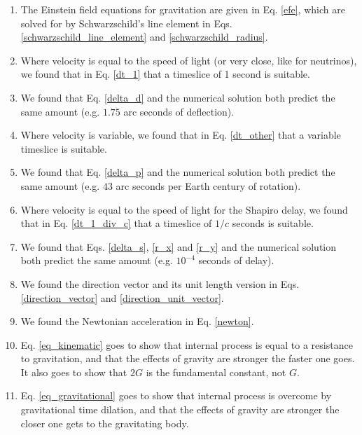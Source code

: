 \documentclass[12pt]{article}
\begin{document}
\begin{enumerate}

\item
The Einstein field equations for gravitation are given in Eq. \ref{efe}, which are solved for by Schwarzschild's line element in Eqs. \ref{schwarzschild_line_element} and \ref{schwarzschild_radius}.

\item
Where velocity is equal to the speed of light (or very close, like for neutrinos), we found that in Eq. \ref{dt_1} that a timeslice of 1 second is suitable.

\item
We found that Eq. \ref{delta_d} and the numerical solution both predict the same amount (e.g. $1.75$ arc seconds of deflection).

\item
Where velocity is variable, we found that in Eq. \ref{dt_other} that a variable timeslice is suitable.

\item
We found that Eq. \ref{delta_p} and the numerical solution both predict the same amount (e.g. $43$ arc seconds per Earth century of rotation).

\item
Where velocity is equal to the speed of light for the Shapiro delay, we found that in Eq. \ref{dt_1_div_c} that a timeslice of $1/c$ seconds is suitable.

\item 
We found that Eqs. \ref{delta_s}, \ref{r_x} and \ref{r_y} and the numerical solution both predict the same amount (e.g. $10^{-4}$ seconds of delay).

\item
We found the direction vector and its unit length version in Eqs. \ref{direction_vector} and \ref{direction_unit_vector}.

\item
We found the Newtonian acceleration in Eq. \ref{newton}.

\item
Eq. \ref{eq_kinematic} goes to show that internal process is equal to a resistance to gravitation, and that the effects of gravity are stronger the faster one goes.
It also goes to show that $2G$ is the fundamental constant, not $G$.

\item
Eq. \ref{eq_gravitational} goes to show that internal process is overcome by gravitational time dilation, and that the effects of gravity are stronger the closer one gets to the gravitating body.


\end{enumerate}
\end{document}
